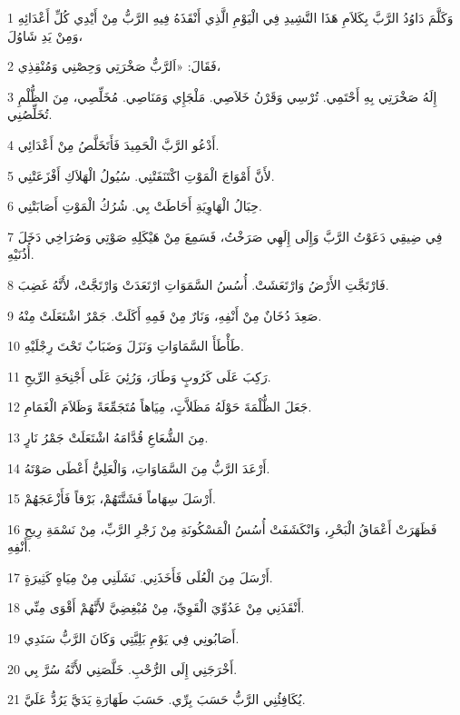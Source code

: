 \par 1 وَكَلَّمَ دَاوُدُ الرَّبَّ بِكَلاَمِ هَذَا النَّشِيدِ فِي الْيَوْمِ الَّذِي أَنْقَذَهُ فِيهِ الرَّبُّ مِنْ أَيْدِي كُلِّ أَعْدَائِهِ وَمِنْ يَدِ شَاوُلَ،
\par 2 فَقَالَ: «اَلرَّبُّ صَخْرَتِي وَحِصْنِي وَمُنْقِذِي،
\par 3 إِلَهُ صَخْرَتِي بِهِ أَحْتَمِي. تُرْسِي وَقَرْنُ خَلاَصِي. مَلْجَإِي وَمَنَاصِي. مُخَلِّصِي، مِنَ الظُّلْمِ تُخَلِّصُنِي.
\par 4 أَدْعُو الرَّبَّ الْحَمِيدَ فَأَتَخَلَّصُ مِنْ أَعْدَائِي.
\par 5 لأَنَّ أَمْوَاجَ الْمَوْتِ اكْتَنَفَتْنِي. سُيُولُ الْهَلاَكِ أَفْزَعَتْنِي.
\par 6 حِبَالُ الْهَاوِيَةِ أَحَاطَتْ بِي. شُرُكُ الْمَوْتِ أَصَابَتْنِي.
\par 7 فِي ضِيقِي دَعَوْتُ الرَّبَّ وَإِلَى إِلَهِي صَرَخْتُ، فَسَمِعَ مِنْ هَيْكَلِهِ صَوْتِي وَصُرَاخِي دَخَلَ أُذُنَيْهِ.
\par 8 فَارْتَجَّتِ الأَرْضُ وَارْتَعَشَتْ. أُسُسُ السَّمَوَاتِ ارْتَعَدَتْ وَارْتَجَّتْ، لأَنَّهُ غَضِبَ.
\par 9 صَعِدَ دُخَانٌ مِنْ أَنْفِهِ، وَنَارٌ مِنْ فَمِهِ أَكَلَتْ. جَمْرٌ اشْتَعَلَتْ مِنْهُ.
\par 10 طَأْطَأَ السَّمَاوَاتِ وَنَزَلَ وَضَبَابٌ تَحْتَ رِجْلَيْهِ.
\par 11 رَكِبَ عَلَى كَرُوبٍ وَطَارَ، وَرُئِيَ عَلَى أَجْنِحَةِ الرِّيحِ.
\par 12 جَعَلَ الظُّلْمَةَ حَوْلَهُ مَظَلاَّتٍ، مِيَاهاً مُتَجَمِّعَةً وَظَلاَمَ الْغَمَامِ.
\par 13 مِنَ الشُّعَاعِ قُدَّامَهُ اشْتَعَلَتْ جَمْرُ نَارٍ.
\par 14 أَرْعَدَ الرَّبُّ مِنَ السَّمَاوَاتِ، وَالْعَلِيُّ أَعْطَى صَوْتَهُ.
\par 15 أَرْسَلَ سِهَاماً فَشَتَّتَهُمْ، بَرْقاً فَأَزْعَجَهُمْ.
\par 16 فَظَهَرَتْ أَعْمَاقُ الْبَحْرِ، وَانْكَشَفَتْ أُسُسُ الْمَسْكُونَةِ مِنْ زَجْرِ الرَّبِّ، مِنْ نَسْمَةِ رِيحِ أَنْفِهِ.
\par 17 أَرْسَلَ مِنَ الْعُلَى فَأَخَذَنِي. نَشَلَنِي مِنْ مِيَاهٍ كَثِيرَةٍ.
\par 18 أَنْقَذَنِي مِنْ عَدُوِّيَ الْقَوِيِّ، مِنْ مُبْغِضِيَّ لأَنَّهُمْ أَقْوَى مِنِّي.
\par 19 أَصَابُونِي فِي يَوْمِ بَلِيَّتِي وَكَانَ الرَّبُّ سَنَدِي.
\par 20 أَخْرَجَنِي إِلَى الرُّحْبِ. خَلَّصَنِي لأَنَّهُ سُرَّ بِي.
\par 21 يُكَافِئُنِي الرَّبُّ حَسَبَ بِرِّي. حَسَبَ طَهَارَةِ يَدَيَّ يَرُدُّ عَلَيَّ.
